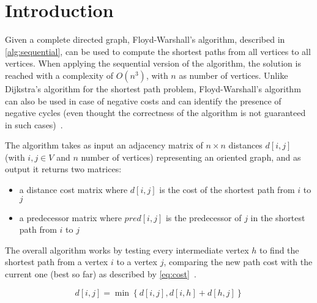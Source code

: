 \section{Introduction}\label{introduction}

Given a complete directed  graph, Floyd-Warshall's algorithm, described in \cref{alg:sequential}, can be used to compute the shortest paths from all vertices to all vertices.
When applying the sequential version of the algorithm, the solution is reached with a complexity of \(O(n^3)\), with \(n\) as number of vertices.
Unlike Dijkstra's algorithm for the shortest path problem, Floyd-Warshall's algorithm can also be used in case of negative costs and can identify the presence of negative cycles 
(even thought the correctness of the algorithm is not guaranteed in such cases)~\cite{fischetti}.

The algorithm takes as input an adjacency matrix of $n \times n$  distances $d[i,j]$ (with $i,j \in V$ and $n$ number of vertices) representing an oriented graph, and as output it returns two matrices:
\begin{itemize}
    \item a distance cost matrix where \(d[i,j]\) is the cost of the shortest path from \(i\) to \(j\)
    \item a predecessor matrix where \(pred[i,j]\) is the predecessor of \(j\) in the shortest path from \(i\) to \(j\)
  \end{itemize}

The overall algorithm works by testing every intermediate vertex \(h\) to find the shortest path from a vertex \(i\) to a vertex \(j\),
comparing the new path cost with the current one (best so far) as described by \cref{eq:cost}~\cite{fischetti}.

\begin{equation} \label{eq:cost}
    d[i,j] = \min\left\{ d[i,j], d[i,h]+d[h,j] \right\}
\end{equation}

